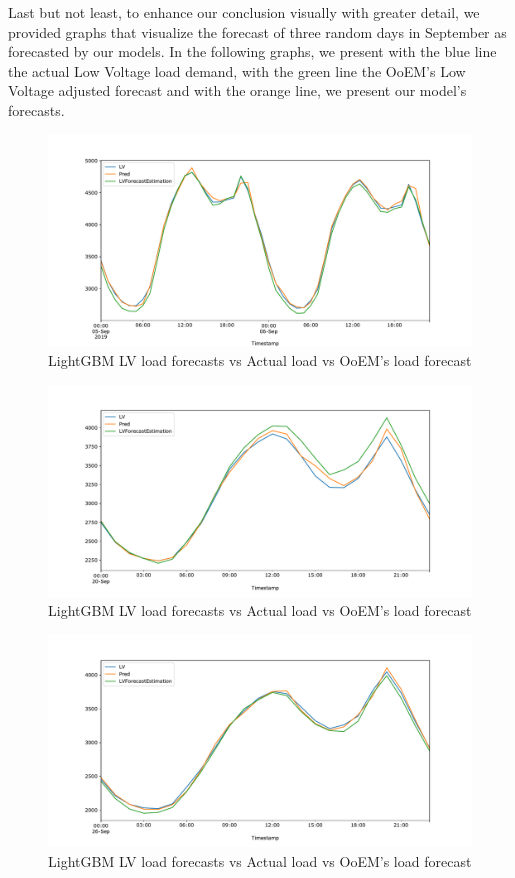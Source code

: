 Last but not least, to enhance our conclusion visually with greater detail, we provided graphs that visualize the forecast of three random days in September as forecasted by our models. In the following graphs, we present with the blue line the actual Low Voltage load demand, with the green line the OoEM's Low Voltage adjusted forecast and with the orange line, we present our model's forecasts. 
\begin{figure}[ht!]
\centering
\includegraphics[width=1\linewidth]{project/last1.pdf}

\caption{LightGBM LV load forecasts vs Actual load vs OoEM’s load forecast}
\end{figure}
\begin{figure}[ht!]
\centering
\includegraphics[width=1\linewidth]{project/last2.pdf}

\caption{LightGBM LV load forecasts vs Actual load vs OoEM’s load forecast}
\end{figure}
\begin{figure}[ht!]
\centering
\includegraphics[width=1\linewidth]{project/last3.pdf}

\caption{LightGBM LV load forecasts vs Actual load vs OoEM’s load forecast}
\end{figure}